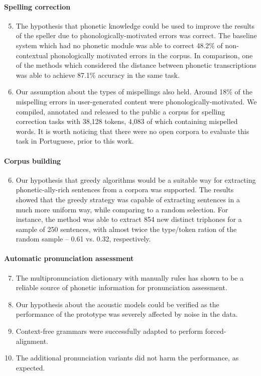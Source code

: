 \paragraph*{Spelling correction}
  \begin{enumerate}
    \setcounter{enumi}{4}
    \item The hypothesis that phonetic knowledge could be used to improve the results of the speller due to phonologically-motivated errors was correct. The baseline system which had no phonetic module was able to correct 48.2\% of non-contextual phonologically motivated errors in the corpus. In comparison, one of the methods which considered the distance between phonetic transcriptions was  able to achieve 87.1\% accuracy in the same task.
    \item Our assumption about the types of mispellings also held. Around 18\% of the mispelling errors in user-generated content were phonologically-motivated. We compiled, annotated and released to the public a corpus for spelling correction tasks with 38,128 tokens, 4,083 of which containing mispelled words. It is worth noticing that there were no open corpora to evaluate this task in Portuguese, prior to this work.
  \end{enumerate}

\paragraph*{Corpus building}
  \begin{enumerate}
    \setcounter{enumi}{5}
    \item Our hypothesis that greedy algorithms would be a suitable way for extracting phonetic-ally-rich sentences from a corpora was supported. The results showed that the greedy strategy was capable of extracting sentences in a much more uniform way, while comparing to a random selection. For instance, the method was able to extract 854 new distinct triphones for a sample of 250 sentences, with almost twice the type/token ration of the random sample -- 0.61 vs. 0.32, respectively.
  \end{enumerate}

\paragraph*{Automatic pronunciation assessment}
  \begin{enumerate}
    \setcounter{enumi}{6}
    \item The multipronunciation dictionary with manually rules has shown to be a reliable source of phonetic information for pronunciation assessment.
    \item Our hypothesis about the acoustic models could be verified as the performance of the prototype was severely affected by noise in the data.
    \item Context-free grammars were successfully adapted to perform forced-alignment.
    \item The additional pronunciation variants did not harm the performance, as expected.
  \end{enumerate}

